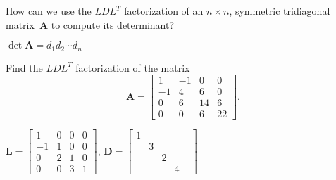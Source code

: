 \begin{Exercises}
\exercise
How can we use the $LDL^T$ factorization of an $n\times n$, symmetric 
tridiagonal matrix~$\boldsymbol{A}$ to compute its determinant?
\begin{ans} 
$\det\boldsymbol{A}=d_1d_2\cdots d_n$
\end{ans}

\exercise
Find the $LDL^T$ factorization of the matrix
\[
\boldsymbol{A}=\begin{bmatrix}1&-1&0&0\\ -1&4&6&0\\ 0&6&14&6\\ 0&0&6&22
\end{bmatrix}.
\]
\begin{ans}
$\boldsymbol{L}=\begin{bmatrix}1&0&0&0\\ -1&1&0&0\\ 0&2&1&0\\ 0&0&3&1 
\end{bmatrix}$,
$\boldsymbol{D}=\begin{bmatrix}1&&&\\ &3&&\\ &&2&&\\ &&&4\end{bmatrix}$
\end{ans}


\end{Exercises}
